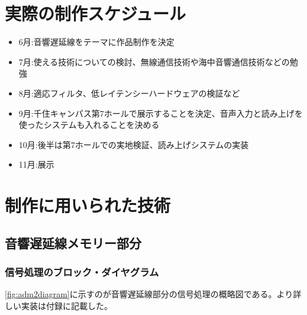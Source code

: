 \documentclass[a4paper,report]{jsbook}
\begin{document}
\section{実際の制作スケジュール}\label{ux5b9fux969bux306eux5236ux4f5cux30b9ux30b1ux30b8ux30e5ux30fcux30eb}

\begin{itemize}
\tightlist
\item
  6月:音響遅延線をテーマに作品制作を決定
\item
  7月:使える技術についての検討、無線通信技術や海中音響通信技術などの勉強
\item
  8月:適応フィルタ、低レイテンシーハードウェアの検証など
\item
  9月:千住キャンパス第7ホールで展示することを決定、音声入力と読み上げを使ったシステムも入れることを決める
\item
  10月:後半は第7ホールでの実地検証、読み上げシステムの実装
\item
  11月:展示
\end{itemize}

\section{制作に用いられた技術}\label{ux5236ux4f5cux306bux7528ux3044ux3089ux308cux305fux6280ux8853}

\subsection{音響遅延線メモリー部分}\label{ux97f3ux97ffux9045ux5ef6ux7ddaux30e1ux30e2ux30eaux30fcux90e8ux5206}

\subsubsection{信号処理のブロック・ダイヤグラム}\label{ux4fe1ux53f7ux51e6ux7406ux306eux30d6ux30edux30c3ux30afux30c0ux30a4ux30e4ux30b0ux30e9ux30e0}

\cref{fig:adm2diagram}に示すのが音響遅延線部分の信号処理の概略図である。より詳しい実装は付録に記載した。
\end{document}
